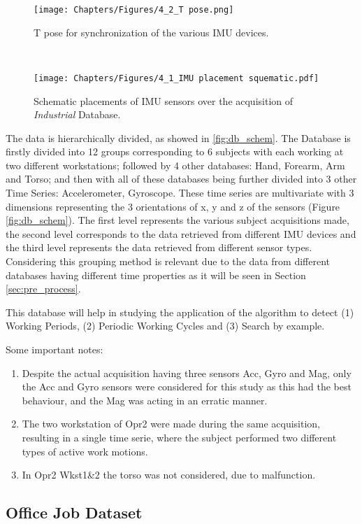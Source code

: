 \begin{figure}[ht]
\begin{adjustwidth}{-1cm}{-1.2cm}
\centering
\begin{minipage}{.4\textwidth}
    \texttt{[image: Chapters/Figures/4\_2\_T pose.png]}
    \caption[T pose for synchronization]{T pose for synchronization of the various IMU devices.}
    \label{fig:t_pose}
\end{minipage}
\begin{minipage}{.05\textwidth}
\hspace*{0.5cm}\\
\end{minipage}
\begin{minipage}{.5\textwidth}
    \texttt{[image: Chapters/Figures/4\_1\_IMU placement squematic.pdf]}
    \caption[Schematic placements of IMU sensors]{Schematic placements of IMU sensors over the acquisition of \textit{Industrial} Database.}
    \label{fig:imu_schem}
\end{minipage}
\end{adjustwidth}
\end{figure}

The data is hierarchically divided, as showed in \ref{fig:db_schem}. The Database is firstly divided into 12 groups corresponding to 6 subjects with each working at two different workstations; followed by 4 other databases: Hand, Forearm, Arm and Torso; and then with all of these databases being further divided into 3 other Time Series: Accelerometer, Gyroscope. These time series are multivariate with 3 dimensions representing the 3 orientations of x, y and z of the sensors (Figure \ref{fig:db_schem}). The first level represents the various subject acquisitions made, the second level corresponds to the data retrieved from different \gls{IMU} devices and the third level represents the data retrieved from different sensor types. Considering this grouping method is relevant due to the data from different databases having different time properties as it will be seen in Section \ref{sec:pre_process}.


This database will help in studying the application of the algorithm to detect (1) Working Periods, (2) Periodic Working Cycles and (3) Search by example.

Some important notes:
\begin{enumerate}
\item Despite the actual acquisition having three sensors \gls{Acc}, \gls{Gyro} and \gls{Mag}, only the \gls{Acc} and \gls{Gyro} sensors were considered for this study as this had the best behaviour, and the \gls{Mag} was acting in an erratic manner.
\item The two workstation of \gls{Opr}2 were made during the same acquisition, resulting in a single time serie, where the subject performed two different types of active work motions.
\item In \gls{Opr}2 \gls{Wkst}1\&2 the torso was not considered, due to malfunction.
\end{enumerate}


\subsection{Office Job Dataset}
